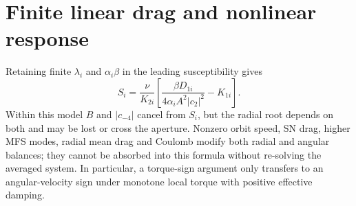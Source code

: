 \section{Finite linear drag and nonlinear response}
Retaining finite $\lambda_i$ and $\alpha_i\beta$ in the leading susceptibility gives
\begin{equation}
S_i=\frac{\nu}{K_{2i}}\left[\frac{\beta D_{1i}}{4\alpha_iA^2|c_2|^2}-K_{1i}\right].
\end{equation}
Within this model $B$ and $|c_{-4}|$ cancel from $S_i$, but the radial root depends on both and may be lost or cross the aperture. Nonzero orbit speed, SN drag, higher MFS modes, radial mean drag and Coulomb modify both radial and angular balances; they cannot be absorbed into this formula without re-solving the averaged system. In particular, a torque-sign argument only transfers to an angular-velocity sign under monotone local torque with positive effective damping.
